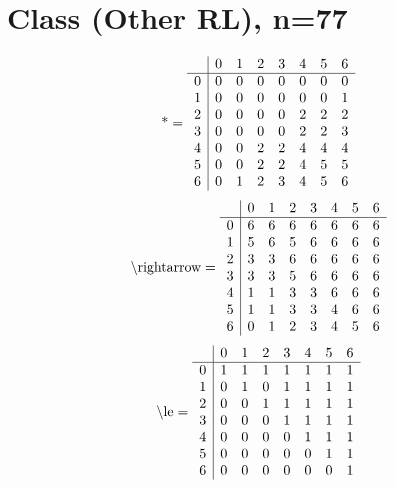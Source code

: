 \documentclass[11pt]{article}
\begin{document}
\section{Class (Other RL), n=77}
\[\text{*} = 
\begin{array}{r | r r r r r r r}
 & 0 & 1 & 2 & 3 & 4 & 5 & 6 \\ \hline
0 & 0 & 0 & 0 & 0 & 0 & 0 & 0 \\
1 & 0 & 0 & 0 & 0 & 0 & 0 & 1 \\
2 & 0 & 0 & 0 & 0 & 2 & 2 & 2 \\
3 & 0 & 0 & 0 & 0 & 2 & 2 & 3 \\
4 & 0 & 0 & 2 & 2 & 4 & 4 & 4 \\
5 & 0 & 0 & 2 & 2 & 4 & 5 & 5 \\
6 & 0 & 1 & 2 & 3 & 4 & 5 & 6 \\
\end{array}
\]
\[\text{\textbackslash rightarrow} = 
\begin{array}{r | r r r r r r r}
 & 0 & 1 & 2 & 3 & 4 & 5 & 6 \\ \hline
0 & 6 & 6 & 6 & 6 & 6 & 6 & 6 \\
1 & 5 & 6 & 5 & 6 & 6 & 6 & 6 \\
2 & 3 & 3 & 6 & 6 & 6 & 6 & 6 \\
3 & 3 & 3 & 5 & 6 & 6 & 6 & 6 \\
4 & 1 & 1 & 3 & 3 & 6 & 6 & 6 \\
5 & 1 & 1 & 3 & 3 & 4 & 6 & 6 \\
6 & 0 & 1 & 2 & 3 & 4 & 5 & 6 \\
\end{array}
\]
\[\text{\textbackslash le} = 
\begin{array}{r | r r r r r r r}
 & 0 & 1 & 2 & 3 & 4 & 5 & 6 \\ \hline
0 & 1 & 1 & 1 & 1 & 1 & 1 & 1 \\
1 & 0 & 1 & 0 & 1 & 1 & 1 & 1 \\
2 & 0 & 0 & 1 & 1 & 1 & 1 & 1 \\
3 & 0 & 0 & 0 & 1 & 1 & 1 & 1 \\
4 & 0 & 0 & 0 & 0 & 1 & 1 & 1 \\
5 & 0 & 0 & 0 & 0 & 0 & 1 & 1 \\
6 & 0 & 0 & 0 & 0 & 0 & 0 & 1 \\
\end{array}
\]
\end{document}
